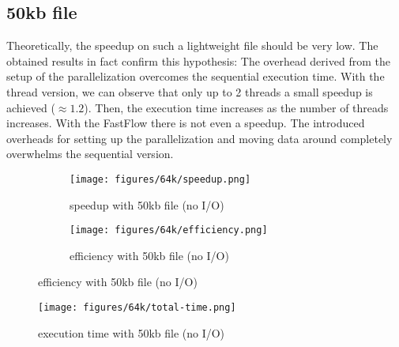 \documentclass{article}
\begin{document}
\subsection{50kb file}
Theoretically, the speedup on such a lightweight file should be very low.
The obtained results in fact confirm this hypothesis: The overhead derived
from the setup of the parallelization overcomes the sequential execution time.
With the thread version, we can observe that only up to 2 threads a small speedup is achieved ($\approx 1.2$).
Then, the execution time increases as the number of threads increases.
With the FastFlow there is not even a speedup. The introduced overheads
for setting up the parallelization and moving data around completely overwhelms the sequential version.
\begin{figure}[H]
    \begin{subfigure}{0.6\textwidth}
        \centering
        \texttt{[image: figures/64k/speedup.png]}
        \caption{speedup with 50kb file (no I/O)}
    \end{subfigure}
    \begin{subfigure}{0.6\textwidth}
        \centering
        \texttt{[image: figures/64k/efficiency.png]}
        \caption{efficiency with 50kb file (no I/O)}
    \end{subfigure}
\end{figure}
\begin{figure}[H]
        \centering
        \texttt{[image: figures/64k/total-time.png]}
        \caption{execution time with 50kb file (no I/O)}
\end{figure}
\end{document}
